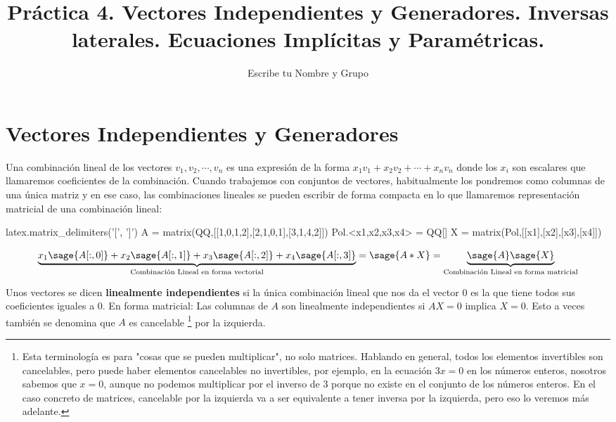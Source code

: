 \documentclass{amsart}
\title{Práctica 4. Vectores Independientes y Generadores. Inversas laterales. Ecuaciones Implícitas y Paramétricas. }
\author{Escribe tu Nombre y Grupo}
\begin{document}
\maketitle

\section{Vectores Independientes y Generadores}

Una combinación lineal de los vectores $v_1, v_2, \cdots, v_n$ es una 
expresión de la forma $x_1 v_1 + x_2 v_2 + \cdots + x_n v_n$ donde los
$x_i$ son escalares que llamaremos coeficientes de la combinación. Cuando
trabajemos con conjuntos de vectores, habitualmente los pondremos como 
columnas de una única matriz y en ese caso, las combinaciones lineales
se pueden escribir de forma compacta en lo que llamaremos representación
matricial de una combinación lineal:

\begin{sagecode}
latex.matrix_delimiters('[', ']')
A = matrix(QQ,[[1,0,1,2],[2,1,0,1],[3,1,4,2]])
Pol.<x1,x2,x3,x4> = QQ[]
X = matrix(Pol,[[x1],[x2],[x3],[x4]])
\end{sagecode}

$$ \underbrace{x_1 \sage{A[:,0]} + x_2 \sage{A[:,1]} + x_3 \sage{A[:,2]} + x_4 \sage{A[:,3]}}_{\text{Combinación Lineal en forma vectorial}} = \sage{A*X} = \underbrace{\sage{A} \sage{X}}_{\text{Combinación Lineal en forma matricial}} $$ 

Unos vectores se dicen {\bf linealmente independientes} si la única 
combinación  lineal que nos da el vector $0$ es la que tiene todos sus 
coeficientes  iguales a $0$. En forma matricial: Las columnas de $A$ son 
linealmente independientes si $AX = 0$ implica $X = 0$. Esto a veces también 
se denomina que $A$ es cancelable
\footnote{Esta terminología es para "cosas que se pueden multiplicar", no solo matrices. Hablando en general, todos los 
elementos invertibles son cancelables, pero puede haber elementos cancelables
no invertibles, por ejemplo, en la ecuación $3x=0$ en los números enteros,
nosotros sabemos que $x = 0$, aunque no podemos multiplicar por el inverso
de $3$ porque no existe en el conjunto de los números enteros. En el caso
concreto de matrices, cancelable por la izquierda va a ser equivalente a
tener inversa por la izquierda, pero eso lo veremos más adelante.}  
por la izquierda. 
\end{document}
